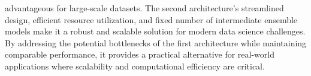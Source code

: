 advantageous for large-scale datasets. The second architecture's streamlined design, efficient resource utilization, and fixed number of intermediate ensemble models make it a robust and scalable solution for modern data science challenges. By addressing the potential bottlenecks of the first architecture while maintaining comparable performance, it provides a practical alternative for real-world applications where scalability and computational efficiency are critical.




\pagebreak

